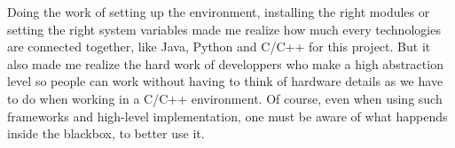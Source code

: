 \documentclass[10pt,twocolumn,letterpaper]{article}
\begin{document}
Doing the work of setting up the environment, installing the right modules or
setting the right system variables made me realize how much every technologies
are connected together, like Java, Python and C/C++ for this project. But it
also made me realize the hard work of developpers who make a high abstraction
level so people can work without having to think of hardware details as we have
to do when working in a C/C++ environment. Of course, even when using such
frameworks and high-level implementation, one must be aware of what happends
inside the blackbox, to better use it.


\end{document}
